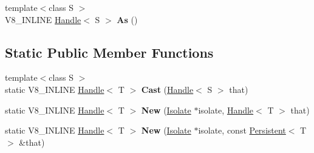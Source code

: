 \begin{DoxyCompactItemize}
\item 
\hypertarget{classv8_1_1_handle_a83d8ef8d1397499d6c176900c2fdc2a7}{}{\footnotesize template$<$class S $>$ }\\V8\+\_\+\+I\+N\+L\+I\+N\+E \hyperlink{classv8_1_1_handle}{Handle}$<$ S $>$ {\bfseries As} ()\label{classv8_1_1_handle_a83d8ef8d1397499d6c176900c2fdc2a7}

\end{DoxyCompactItemize}
\subsection*{Static Public Member Functions}
\begin{DoxyCompactItemize}
\item 
\hypertarget{classv8_1_1_handle_a59abe49d5f16adbb2e83c2edefd62cbd}{}{\footnotesize template$<$class S $>$ }\\static V8\+\_\+\+I\+N\+L\+I\+N\+E \hyperlink{classv8_1_1_handle}{Handle}$<$ T $>$ {\bfseries Cast} (\hyperlink{classv8_1_1_handle}{Handle}$<$ S $>$ that)\label{classv8_1_1_handle_a59abe49d5f16adbb2e83c2edefd62cbd}

\item 
\hypertarget{classv8_1_1_handle_ac464e6bb14b23169af0616ac75ea6be1}{}static V8\+\_\+\+I\+N\+L\+I\+N\+E \hyperlink{classv8_1_1_handle}{Handle}$<$ T $>$ {\bfseries New} (\hyperlink{classv8_1_1_isolate}{Isolate} $\ast$isolate, \hyperlink{classv8_1_1_handle}{Handle}$<$ T $>$ that)\label{classv8_1_1_handle_ac464e6bb14b23169af0616ac75ea6be1}

\item 
\hypertarget{classv8_1_1_handle_a51b6d2c6cdb8cfa896d8a99c25c9b532}{}static V8\+\_\+\+I\+N\+L\+I\+N\+E \hyperlink{classv8_1_1_handle}{Handle}$<$ T $>$ {\bfseries New} (\hyperlink{classv8_1_1_isolate}{Isolate} $\ast$isolate, const \hyperlink{classv8_1_1_persistent}{Persistent}$<$ T $>$ \&that)\label{classv8_1_1_handle_a51b6d2c6cdb8cfa896d8a99c25c9b532}

\end{DoxyCompactItemize}
